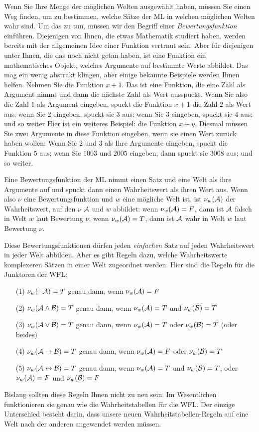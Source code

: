Wenn Sie Ihre Menge der möglichen Welten ausgewählt haben, müssen Sie einen Weg finden, um zu bestimmen, welche Sätze der ML in welchen möglichen Welten wahr sind. Um das zu tun, müssen wir den Begriff einer \emph{Bewertungsfunktion} einführen. Diejenigen von Ihnen, die etwas Mathematik studiert haben, werden bereits mit der allgemeinen Idee einer Funktion vertraut sein. Aber für diejenigen unter Ihnen, die das noch nicht getan haben, ist eine Funktion ein mathematisches Objekt, welches Argumente auf bestimmte Werte abbildet. Das mag ein wenig abstrakt klingen, aber einige bekannte Beispiele werden Ihnen helfen. Nehmen Sie die Funktion $x+1$. Das ist eine Funktion, die eine Zahl als Argument nimmt und dann die nächste Zahl als Wert ausspuckt. Wenn Sie also die Zahl $1$ als Argument eingeben, spuckt die Funktion $x+1$ die Zahl $2$ als Wert aus; wenn Sie $2$ eingeben, spuckt sie $3$ aus; wenn Sie $3$ eingeben, spuckt sie $4$ aus; und so weiter Hier ist ein weiteres Beispiel: die Funktion $x+y$. Diesmal müssen Sie zwei Argumente in diese Funktion eingeben, wenn sie einen Wert zurück haben wollen: Wenn Sie $2$ und $3$ als Ihre Argumente eingeben, spuckt die Funktion $5$ aus; wenn Sie $1003$ und $2005$ eingeben, dann spuckt sie $3008$ aus; und so weiter.

Eine Bewertungsfunktion der ML nimmt einen Satz und eine Welt als ihre Argumente auf und spuckt dann einen Wahrheitswert als ihren Wert aus. Wenn also $\nu$ eine Bewertungsfunktion und $w$ eine mögliche Welt ist, ist $\nu_w(\mathcal{A})$ der Wahrheitswert, auf den $\nu$ $\mathcal{A}$ und $w$ abbildet: wenn $\nu_w(\mathcal{A})=F$, dann ist $\mathcal{A}$ falsch in Welt $w$ laut Bewertung $\nu$; wenn $\nu_w(\mathcal{A})=T$, dann ist $\mathcal{A}$ wahr in Welt $w$ laut Bewertung $\nu$.

Diese Bewertungsfunktionen dürfen jeden \emph{einfachen} Satz auf jeden Wahrheitswert in jeder Welt abbilden. Aber es gibt Regeln dazu, welche Wahrheitswerte komplexeren Sätzen in einer Welt zugeordnet werden. Hier sind die Regeln für die Junktoren der WFL:
\begin{itemize}
	\item[(1)]$\nu_w(\neg\mathcal{A})=T$ genau dann, wenn $\nu_w(\mathcal{A})=F$
	\item[(2)]$\nu_w(\mathcal{A}\wedge\mathcal{B})=T$ genau dann, wenn $\nu_w(\mathcal{A})=T$ und $\nu_w(\mathcal{B})=T$
	\item[(3)]$\nu_w(\mathcal{A}\vee\mathcal{B})=T$ genau dann, wenn $\nu_w(\mathcal{A})=T$ oder $\nu_w(\mathcal{B})=T$ (oder beides)
	\item[(4)]$\nu_w(\mathcal{A}\rightarrow\mathcal{B})=T$ genau dann, wenn $\nu_w(\mathcal{A})=F$ oder $\nu_w(\mathcal{B})=T$
	\item[(5)]$\nu_w(\mathcal{A}\leftrightarrow\mathcal{B})=T$ genau dann, wenn $\nu_w(\mathcal{A})=T$ und $\nu_w(\mathcal{B})=T$, oder $\nu_w(\mathcal{A})=F$ und $\nu_w(\mathcal{B})=F$
\end{itemize}
Bislang sollten diese Regeln Ihnen nicht zu neu sein. Im Wesentlichen funktionieren sie genau wie die Wahrheitstabellen für die WFL. Der einzige Unterschied besteht darin, dass unsere neuen Wahrheitstabellen-Regeln auf eine Welt nach der anderen angewendet werden müssen.

